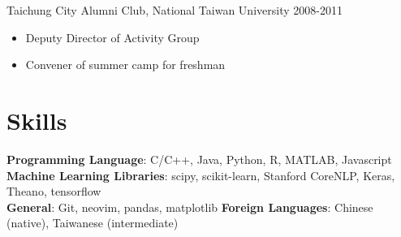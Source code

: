 \documentclass[a4paper,10pt]{article}
\begin{document}
Taichung City Alumni Club, National Taiwan University \hfill 2008-2011
\begin{itemize}
    \item Deputy Director of Activity Group
    \item Convener of summer camp for freshman
\end{itemize}

\section{Skills}
\textbf{Programming Language}: C/C++, Java, Python, R, MATLAB, Javascript \\
\textbf{Machine Learning Libraries}: scipy, scikit-learn, Stanford CoreNLP, Keras, Theano, tensorflow \\
\textbf{General}: Git, neovim, pandas, matplotlib 
\textbf{Foreign Languages}: Chinese (native), Taiwanese (intermediate)
\end{document}
